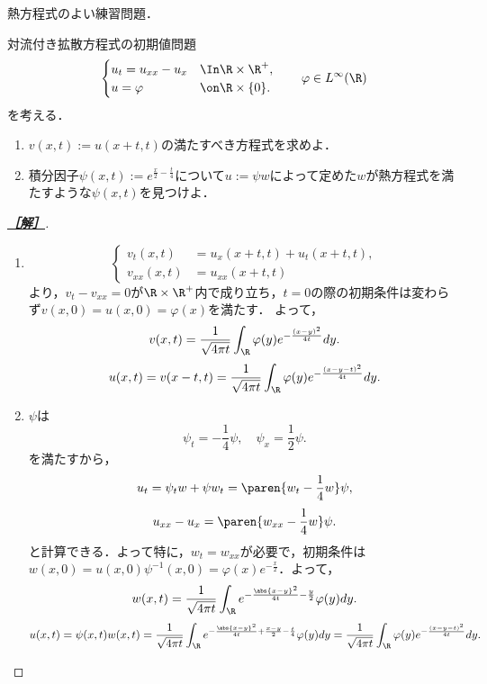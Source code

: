\documentclass[uplatex,dvipdfmx]{jsarticle}
\begin{document}
\begin{tcolorbox}[colframe=ForestGreen, colback=ForestGreen!10!white,breakable,colbacktitle=ForestGreen!40!white,coltitle=black,fonttitle=\bfseries\sffamily,
title=]
    熱方程式のよい練習問題．
\end{tcolorbox}

\begin{problem}
    対流付き拡散方程式の初期値問題
    \[\begin{cases}
        u_t=u_{xx}-u_x&\In\R\times\R^+,\\
        u=\varphi&\on\R\times\{0\}.
    \end{cases}\qquad \varphi\in L^\infty(\R)\]
    を考える．
    \begin{enumerate}
        \item $v(x,t):=u(x+t,t)$の満たすべき方程式を求めよ．
        \item 積分因子$\psi(x,t):=e^{\frac{x}{2}-\frac{t}{4}}$について$u:=\psi w$によって定めた$w$が熱方程式を満たすような$\psi(x,t)$を見つけよ．
    \end{enumerate}
\end{problem}
\begin{proof}[\bf\underline{［解］}]\mbox{}
    \begin{enumerate}
        \item \[\begin{cases}
            v_t(x,t)&=u_x(x+t,t)+u_t(x+t,t),\\
            v_{xx}(x,t)&=u_{xx}(x+t,t)
        \end{cases}\]
        より，$v_t-v_{xx}=0$が$\R\times\R^+$内で成り立ち，$t=0$の際の初期条件は変わらず$v(x,0)=u(x,0)=\varphi(x)$を満たす．
        よって，
        \[v(x,t)=\frac{1}{\sqrt{4\pi t}}\int_\R \varphi(y)e^{-\frac{(x-y)^2}{4t}}dy.\]
        \[u(x,t)=v(x-t,t)=\frac{1}{\sqrt{4\pi t}}\int_\R \varphi(y)e^{-\frac{(x-y-t)^2}{4t}}dy.\]
        \item $\psi$は
        \[\psi_t=-\frac{1}{4}\psi,\quad\psi_x=\frac{1}{2}\psi.\]
        を満たすから，
        \[u_t=\psi_tw+\psi w_t=\paren{w_t-\frac{1}{4}w}\psi,\]
        \[u_{xx}-u_x=\paren{w_{xx}-\frac{1}{4}w}\psi.\]
        と計算できる．よって特に，$w_t=w_{xx}$が必要で，初期条件は$w(x,0)=u(x,0)\psi^{-1}(x,0)=\varphi(x)e^{-\frac{x}{2}}$．よって，
        \[w(x,t)=\frac{1}{\sqrt{4\pi t}}\int_\R e^{-\frac{\abs{x-y}^2}{4t}-\frac{y}{2}}\varphi(y)dy.\]
        \[u(x,t)=\psi(x,t)w(x,t)=\frac{1}{\sqrt{4\pi t}}\int_\R e^{-\frac{\abs{x-y}^2}{4t}+\frac{x-y}{2}-\frac{t}{4}}\varphi(y)dy=\frac{1}{\sqrt{4\pi t}}\int_\R \varphi(y)e^{-\frac{(x-y-t)^2}{4t}}dy.\]
    \end{enumerate}
\end{proof}
\end{document}
